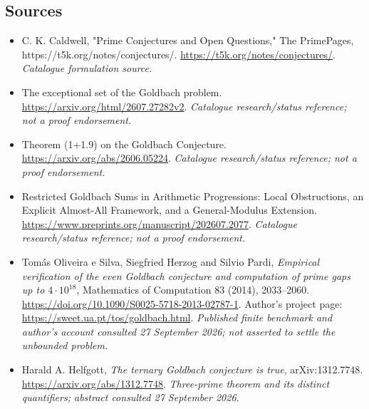 \documentclass[11pt,a4paper]{article}
\numberwithin{equation}{section}
\begin{document}

\subsection{Sources}
\begin{itemize}\raggedright
\item[\textnormal{[S1]}]\hypertarget{source:statement:1}{} C. K. Caldwell, "Prime Conjectures and Open Questions," The PrimePages, https://t5k.org/notes/conjectures/.
\url{https://t5k.org/notes/conjectures/}.
{\small\textit{Catalogue formulation source.}}
\item[\textnormal{[S2]}]\hypertarget{source:statement:2}{} The exceptional set of the Goldbach problem.
\url{https://arxiv.org/html/2607.27282v2}.
{\small\textit{Catalogue research/status reference; not a proof endorsement.}}
\item[\textnormal{[S3]}]\hypertarget{source:statement:3}{} Theorem (1+1.9) on the Goldbach Conjecture.
\url{https://arxiv.org/abs/2606.05224}.
{\small\textit{Catalogue research/status reference; not a proof endorsement.}}
\item[\textnormal{[S4]}]\hypertarget{source:statement:4}{} Restricted Goldbach Sums in Arithmetic Progressions: Local Obstructions, an Explicit Almost-All Framework, and a General-Modulus Extension.
\url{https://www.preprints.org/manuscript/202607.2077}.
{\small\textit{Catalogue research/status reference; not a proof endorsement.}}
\item[\textnormal{[E1]}]\hypertarget{extra:statement:1}{} Tom\'as Oliveira e Silva,
Siegfried Herzog and Silvio Pardi, \emph{Empirical verification of the even
Goldbach conjecture and computation of prime gaps up to $4\cdot10^{18}$},
Mathematics of Computation 83 (2014), 2033--2060.
\url{https://doi.org/10.1090/S0025-5718-2013-02787-1}.
Author's project page: \url{https://sweet.ua.pt/tos/goldbach.html}.
{\small\textit{Published finite benchmark and author's account consulted
27 September 2026; not asserted to settle the unbounded problem.}}
\item[\textnormal{[E2]}]\hypertarget{extra:statement:2}{} Harald A. Helfgott,
\emph{The ternary Goldbach conjecture is true}, arXiv:1312.7748.
\url{https://arxiv.org/abs/1312.7748}.
{\small\textit{Three-prime theorem and its distinct quantifiers;
abstract consulted 27 September 2026.}}

\end{itemize}

\end{document}
